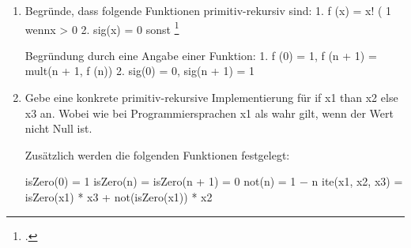\documentclass{bschlangaul-aufgabe}
\begin{document}

\begin{enumerate}

\item Begründe, dass folgende Funktionen primitiv-rekursiv sind:
1. f (x) = x!
(
1 wennx > 0
2. sig(x) =
0 sonst
\footcite[Seite 7, Aufgabe 5]{theo:ab:4}

\begin{bAntwort}
Begründung durch eine Angabe einer Funktion:
1. f (0) = 1, f (n + 1) = mult(n + 1, f (n))
2. sig(0) = 0, sig(n + 1) = 1
\end{bAntwort}


\item Gebe eine konkrete primitiv-rekursive Implementierung für if x1 than x2 else
x3 an.
Wobei wie bei Programmiersprachen x1 als wahr gilt, wenn der Wert nicht Null
ist.

\begin{bAntwort}
 Zusätzlich werden die folgenden Funktionen festgelegt:

isZero(0) = 1
isZero(n) =
isZero(n + 1) = 0
not(n) = 1 − n
ite(x1, x2, x3) = isZero(x1) * x3 + not(isZero(x1)) * x2
\end{bAntwort}

\end{enumerate}
\end{document}
